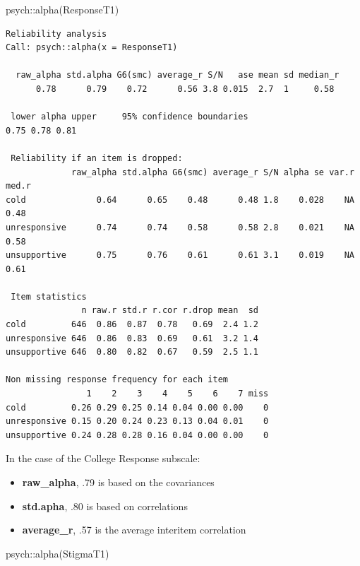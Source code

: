 \documentclass[
  english,
]{book}
\newenvironment{Shaded}{\begin{snugshade}}{\end{snugshade}}
\newcommand{\FunctionTok}[1]{\textcolor[rgb]{0.00,0.00,0.00}{#1}}
\newcommand{\NormalTok}[1]{#1}
\newcommand{\SpecialCharTok}[1]{\textcolor[rgb]{0.00,0.00,0.00}{#1}}
\providecommand{\tightlist}{%
  \setlength{\itemsep}{0pt}\setlength{\parskip}{0pt}}
\begin{document}
\begin{Shaded}
\begin{Highlighting}[]
\NormalTok{psych}\SpecialCharTok{::}\FunctionTok{alpha}\NormalTok{(ResponseT1)}
\end{Highlighting}
\end{Shaded}

\begin{verbatim}
Reliability analysis   
Call: psych::alpha(x = ResponseT1)

  raw_alpha std.alpha G6(smc) average_r S/N   ase mean sd median_r
      0.78      0.79    0.72      0.56 3.8 0.015  2.7  1     0.58

 lower alpha upper     95% confidence boundaries
0.75 0.78 0.81 

 Reliability if an item is dropped:
             raw_alpha std.alpha G6(smc) average_r S/N alpha se var.r med.r
cold              0.64      0.65    0.48      0.48 1.8    0.028    NA  0.48
unresponsive      0.74      0.74    0.58      0.58 2.8    0.021    NA  0.58
unsupportive      0.75      0.76    0.61      0.61 3.1    0.019    NA  0.61

 Item statistics 
               n raw.r std.r r.cor r.drop mean  sd
cold         646  0.86  0.87  0.78   0.69  2.4 1.2
unresponsive 646  0.86  0.83  0.69   0.61  3.2 1.4
unsupportive 646  0.80  0.82  0.67   0.59  2.5 1.1

Non missing response frequency for each item
                1    2    3    4    5    6    7 miss
cold         0.26 0.29 0.25 0.14 0.04 0.00 0.00    0
unresponsive 0.15 0.20 0.24 0.23 0.13 0.04 0.01    0
unsupportive 0.24 0.28 0.28 0.16 0.04 0.00 0.00    0
\end{verbatim}

In the case of the College Response subscale:

\begin{itemize}
\tightlist
\item
  \textbf{raw\_alpha}, .79 is based on the covariances
\item
  \textbf{std.apha}, .80 is based on correlations
\item
  \textbf{average\_r}, .57 is the average interitem correlation
\end{itemize}

\begin{Shaded}
\begin{Highlighting}[]
\NormalTok{psych}\SpecialCharTok{::}\FunctionTok{alpha}\NormalTok{(StigmaT1)}
\end{Highlighting}
\end{Shaded}
\end{document}
